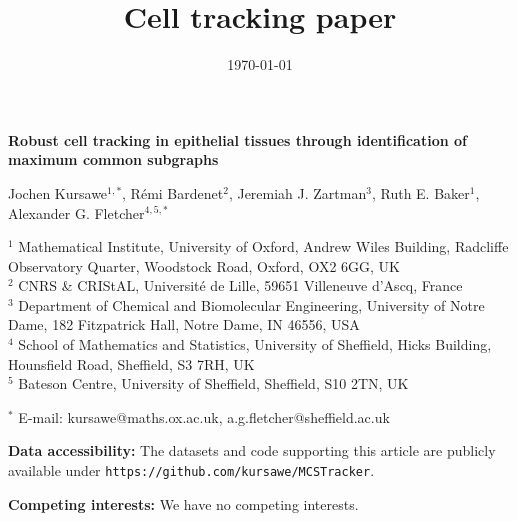 \documentclass[a4paper,11pt]{article}
\title{Cell tracking paper}
\begin{document}
\linenumbers
\doublespacing

\begin{flushleft}
{\Large {\bf Robust cell tracking in epithelial tissues through identification of maximum common subgraphs}}
\vspace{1.0em}

Jochen Kursawe$^{1,\ast}$, 
R\'{e}mi Bardenet$^{2}$,
Jeremiah J. Zartman$^{3}$,
Ruth E. Baker$^{1}$,
Alexander G. Fletcher$^{4,5,\ast}$ 
\vspace{1.0em}

$^{1}$ Mathematical Institute, University of Oxford, Andrew Wiles Building, Radcliffe Observatory Quarter, Woodstock Road, Oxford, OX2 6GG, UK
\\
$^{2}$ CNRS \& CRIStAL, Universit\'{e} de Lille, 59651 Villeneuve d'Ascq, France
\\
$^{3}$ Department of Chemical and Biomolecular Engineering, University of Notre Dame, 182 Fitzpatrick Hall, Notre Dame, IN 46556, USA \\
$^{4}$ School of Mathematics and Statistics, University of Sheffield, Hicks Building, Hounsfield Road, Sheffield, S3 7RH, UK \\
$^{5}$ Bateson Centre, University of Sheffield, Sheffield, S10 2TN, UK
\vspace{1.0em}

$^{\ast}$ E-mail: kursawe@maths.ox.ac.uk, a.g.fletcher@sheffield.ac.uk
\end{flushleft}

\date{\today}
\vspace{1.0em}




\noindent \textbf{Data accessibility:} The datasets and code supporting this article are publicly available under \texttt{https://github.com/kursawe/MCSTracker}.
\vspace{1.0em}


\noindent \textbf{Competing interests:} We have no competing interests.
\vspace{1.0em}
\end{document}
